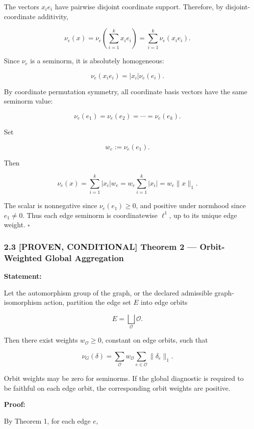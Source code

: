 \documentclass[
  11pt,
]{article}
\begin{document}
The vectors \(x_i e_i\) have pairwise disjoint coordinate support.
Therefore, by disjoint-coordinate additivity,

\[
\nu_e(x) = \nu_e\left(\sum_{i=1}^k x_i e_i\right) = \sum_{i=1}^k \nu_e(x_i e_i).
\]

Since \(\nu_e\) is a seminorm, it is absolutely homogeneous:

\[
\nu_e(x_i e_i)=|x_i|\nu_e(e_i).
\]

By coordinate permutation symmetry, all coordinate basis vectors have
the same seminorm value:

\[
\nu_e(e_1)=\nu_e(e_2)=\cdots=\nu_e(e_k).
\]

Set

\[
w_e:=\nu_e(e_1).
\]

Then

\[
\nu_e(x) = \sum_{i=1}^k |x_i|w_e = w_e\sum_{i=1}^k |x_i| = w_e\|x\|_1.
\]

The scalar is nonnegative since \(\nu_e(e_1)\ge0\), and positive under
normhood since \(e_1\ne0\). Thus each edge seminorm is coordinatewise
\(\ell^1\), up to its unique edge weight. \(\square\)

\hypertarget{proven-conditional-theorem-2-orbit-weighted-global-aggregation}{%
\subsubsection{\texorpdfstring{2.3 \textbf{{[}PROVEN, CONDITIONAL{]}
Theorem 2 --- Orbit-Weighted Global
Aggregation}}{2.3 {[}PROVEN, CONDITIONAL{]} Theorem 2 --- Orbit-Weighted Global Aggregation}}\label{proven-conditional-theorem-2-orbit-weighted-global-aggregation}}

\textbf{Statement:}

Let the automorphism group of the graph, or the declared admissible
graph-isomorphism action, partition the edge set \(E\) into edge orbits

\[
E=\bigsqcup_{\mathcal O} \mathcal O.
\]

Then there exist weights \(w_{\mathcal O}\ge0\), constant on edge
orbits, such that

\[
\nu_G(\delta) = \sum_{\mathcal O} w_{\mathcal O} \sum_{e\in\mathcal O} \|\delta_e\|_1.
\]

Orbit weights may be zero for seminorms. If the global diagnostic is
required to be faithful on each edge orbit, the corresponding orbit
weights are positive.

\textbf{Proof:}

By Theorem 1, for each edge \(e\),
\end{document}
